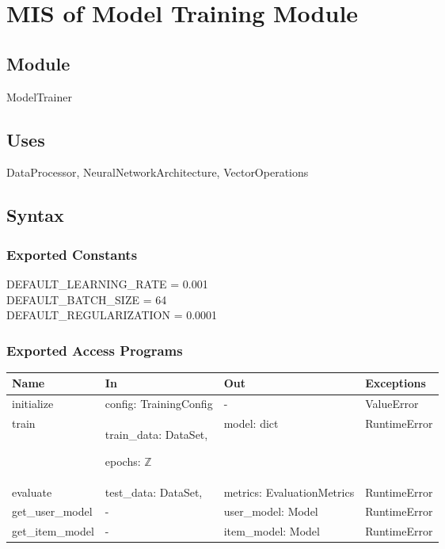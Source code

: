\documentclass[12pt, titlepage]{article}
\begin{document}
\section{MIS of Model Training Module} \label{ModuleMT}

\subsection{Module}

ModelTrainer

\subsection{Uses}
DataProcessor, NeuralNetworkArchitecture, VectorOperations

\subsection{Syntax}

\subsubsection{Exported Constants}
DEFAULT\_LEARNING\_RATE = 0.001\\
DEFAULT\_BATCH\_SIZE = 64\\
DEFAULT\_REGULARIZATION = 0.0001
\subsubsection{Exported Access Programs}

\begin{center}
  \begin{tabular}{p{3cm} p{4cm} p{4cm} p{2cm}}
  \hline
  \textbf{Name} & \textbf{In} & \textbf{Out} & \textbf{Exceptions} \\
  \hline
  initialize & config: TrainingConfig & - & ValueError \\
  \hline
  train & train\_data: DataSet,
  
  epochs: $\mathbb{Z}$
  
  & model: dict & RuntimeError \\
  \hline
  evaluate & test\_data: DataSet,
  
  & metrics: EvaluationMetrics & RuntimeError \\
  \hline
  get\_user\_model & 
  
  - & user\_model: Model & RuntimeError \\
  \hline
  get\_item\_model & 
  
  - & item\_model: Model & RuntimeError \\
  \hline
  \end{tabular}
  \end{center}
\end{document}
